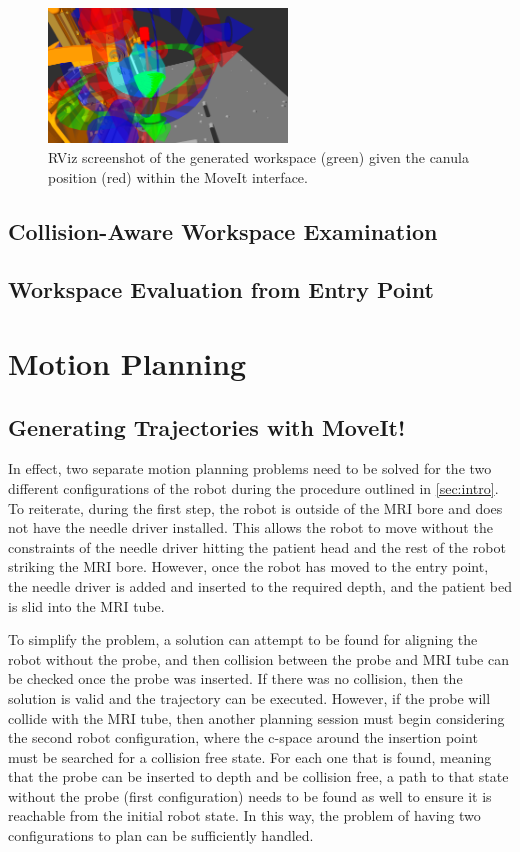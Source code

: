 \documentclass[12pt]{report}
\begin{document}
\begin{figure}[thpb]
	\centering
	\includegraphics[width = 2.5in]{images/workspace_v1.png}
    \caption{RViz screenshot of the generated workspace (green) given the canula position (red) within the MoveIt interface.}
    \label{fig:workspaceAct}
\end{figure}

\section{Collision-Aware Workspace Examination}

\section{Workspace Evaluation from Entry Point}

\chapter{Motion Planning}
\section{Generating Trajectories with MoveIt!}
In effect, two separate motion planning problems need to be solved for the two different configurations of the robot during the procedure outlined in \autoref{sec:intro}. To reiterate, during the first step, the robot is outside of the MRI bore and does not have the needle driver installed. This allows the robot to move without the constraints of the needle driver hitting the patient head and the rest of the robot striking the MRI bore. However, once the robot has moved to the entry point, the needle driver is added and inserted to the required depth, and the patient bed is slid into the MRI tube.

To simplify the problem, a solution can attempt to be found for aligning the robot without the probe, and then collision between the probe and MRI tube can be checked once the probe was inserted. If there was no collision, then the solution is valid and the trajectory can be executed. However, if the probe will collide with the MRI tube, then another planning session must begin considering the second robot configuration, where the c-space around the insertion point must be searched for a collision free state. For each one that is found, meaning that the probe can be inserted to depth and be collision free, a path to that state without the probe (first configuration) needs to be found as well to ensure it is reachable from the initial robot state. In this way, the problem of having two configurations to plan can be sufficiently handled.
\end{document}
